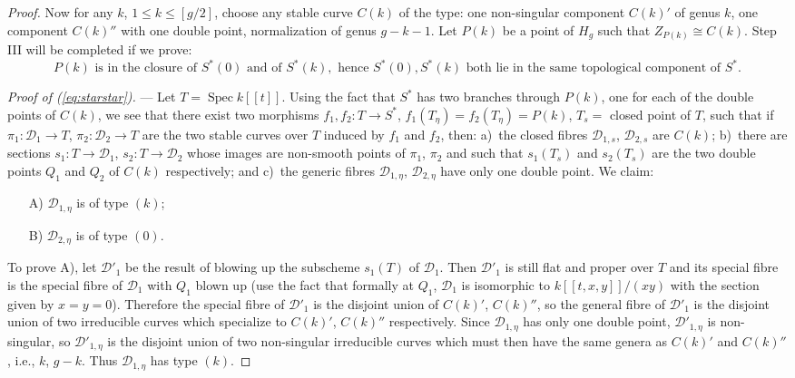\documentclass[10pt]{amsart}
\theoremstyle{plain}
\theoremstyle{definition}
\DeclareMathOperator{\Spec}{Spec}
\begin{document}
\begin{proof}
Now for any $k$, $1 \leq k \leq [g/2]$, choose any stable curve $C(k)$ of the type: one non-singular component $C(k)'$ of genus $k$, one component $C(k)''$ with one double point, normalization of genus $g - k - 1$. Let $P(k)$ be a point of $H_g$ such that $Z_{P(k)} \cong C(k)$. Step III will be completed if we prove:
\begin{equation}\tag{$**$}\label{eq:starstar}
P(k) \text{ is in the closure of } S^*(0) \text{ and of } S^*(k), \text{ hence } S^*(0), S^*(k) \text{ both lie in the same topological component of } S^*.
\end{equation}

\textit{Proof of (\ref{eq:starstar}).} --- Let $T = \Spec k[[t]]$. Using the fact that $S^*$ has two branches through $P(k)$, one for each of the double points of $C(k)$, we see that there exist two morphisms $f_1, f_2: T \to S^*$, $f_1(T_\eta) = f_2(T_\eta) = P(k)$, $T_s = $ closed point of $T$, such that if $\pi_1: \mathscr{D}_1 \to T$, $\pi_2: \mathscr{D}_2 \to T$ are the two stable curves over $T$ induced by $f_1$ and $f_2$, then: a)~the closed fibres $\mathscr{D}_{1,s}$, $\mathscr{D}_{2,s}$ are $C(k)$; b)~there are sections $s_1: T \to \mathscr{D}_1$, $s_2: T \to \mathscr{D}_2$ whose images are non-smooth points of $\pi_1$, $\pi_2$ and such that $s_1(T_s)$ and $s_2(T_s)$ are the two double points $Q_1$ and $Q_2$ of $C(k)$ respectively; and c)~the generic fibres $\mathscr{D}_{1,\eta}$, $\mathscr{D}_{2,\eta}$ have only one double point. We claim:
\begin{enumerate}
\item[A)] $\mathscr{D}_{1,\eta}$ is of type $(k)$;
\item[B)] $\mathscr{D}_{2,\eta}$ is of type $(0)$.
\end{enumerate}

To prove A), let $\mathscr{D}'_1$ be the result of blowing up the subscheme $s_1(T)$ of $\mathscr{D}_1$. Then $\mathscr{D}'_1$ is still flat and proper over $T$ and its special fibre is the special fibre of $\mathscr{D}_1$ with $Q_1$ blown up (use the fact that formally at $Q_1$, $\mathscr{D}_1$ is isomorphic to $k[[t,x,y]]/(xy)$ with the section given by $x = y = 0$). Therefore the special fibre of $\mathscr{D}'_1$ is the disjoint union of $C(k)'$, $C(k)''$, so the general fibre of $\mathscr{D}'_1$ is the disjoint union of two irreducible curves which specialize to $C(k)'$, $C(k)''$ respectively. Since $\mathscr{D}_{1,\eta}$ has only one double point, $\mathscr{D}'_{1,\eta}$ is non-singular, so $\mathscr{D}'_{1,\eta}$ is the disjoint union of two non-singular irreducible curves which must then have the same genera as $C(k)'$ and $C(k)''$, i.e., $k$, $g-k$. Thus $\mathscr{D}_{1,\eta}$ has type $(k)$.


\end{proof}
\end{document}

